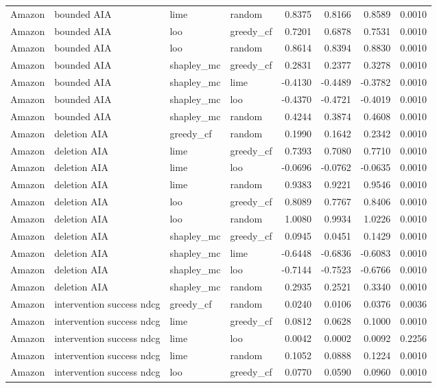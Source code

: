 \begin{longtable}{@{}p{}p{}p{}p{}rrrr@{}}
Amazon & bounded AIA & lime & random & 0.8375 & 0.8166 & 0.8589 & 0.0010 \\
Amazon & bounded AIA & loo & greedy\_cf & 0.7201 & 0.6878 & 0.7531 & 0.0010 \\
Amazon & bounded AIA & loo & random & 0.8614 & 0.8394 & 0.8830 & 0.0010 \\
Amazon & bounded AIA & shapley\_mc & greedy\_cf & 0.2831 & 0.2377 & 0.3278 & 0.0010 \\
Amazon & bounded AIA & shapley\_mc & lime & -0.4130 & -0.4489 & -0.3782 & 0.0010 \\
Amazon & bounded AIA & shapley\_mc & loo & -0.4370 & -0.4721 & -0.4019 & 0.0010 \\
Amazon & bounded AIA & shapley\_mc & random & 0.4244 & 0.3874 & 0.4608 & 0.0010 \\
Amazon & deletion AIA & greedy\_cf & random & 0.1990 & 0.1642 & 0.2342 & 0.0010 \\
Amazon & deletion AIA & lime & greedy\_cf & 0.7393 & 0.7080 & 0.7710 & 0.0010 \\
Amazon & deletion AIA & lime & loo & -0.0696 & -0.0762 & -0.0635 & 0.0010 \\
Amazon & deletion AIA & lime & random & 0.9383 & 0.9221 & 0.9546 & 0.0010 \\
Amazon & deletion AIA & loo & greedy\_cf & 0.8089 & 0.7767 & 0.8406 & 0.0010 \\
Amazon & deletion AIA & loo & random & 1.0080 & 0.9934 & 1.0226 & 0.0010 \\
Amazon & deletion AIA & shapley\_mc & greedy\_cf & 0.0945 & 0.0451 & 0.1429 & 0.0010 \\
Amazon & deletion AIA & shapley\_mc & lime & -0.6448 & -0.6836 & -0.6083 & 0.0010 \\
Amazon & deletion AIA & shapley\_mc & loo & -0.7144 & -0.7523 & -0.6766 & 0.0010 \\
Amazon & deletion AIA & shapley\_mc & random & 0.2935 & 0.2521 & 0.3340 & 0.0010 \\
Amazon & intervention success ndcg & greedy\_cf & random & 0.0240 & 0.0106 & 0.0376 & 0.0036 \\
Amazon & intervention success ndcg & lime & greedy\_cf & 0.0812 & 0.0628 & 0.1000 & 0.0010 \\
Amazon & intervention success ndcg & lime & loo & 0.0042 & 0.0002 & 0.0092 & 0.2256 \\
Amazon & intervention success ndcg & lime & random & 0.1052 & 0.0888 & 0.1224 & 0.0010 \\
Amazon & intervention success ndcg & loo & greedy\_cf & 0.0770 & 0.0590 & 0.0960 & 0.0010 \\

\end{longtable}
